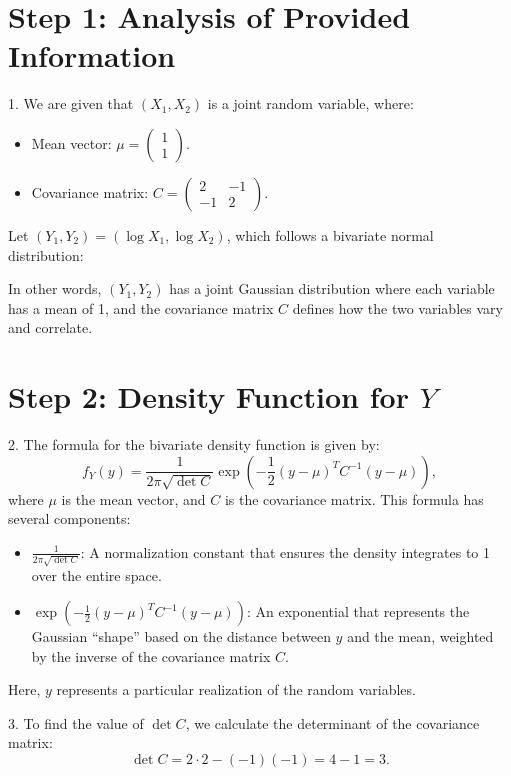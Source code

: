 \documentclass[10pt,letterpaper]{article}
\begin{document}
\section*{Step 1: Analysis of Provided Information}
1. We are given that \((X_1, X_2)\) is a joint random variable, where:
   \begin{itemize}
       \item Mean vector: \(\mu = \begin{pmatrix} 1 \\ 1 \end{pmatrix}\).
       \item Covariance matrix: \(C = \begin{pmatrix} 2 & -1 \\ -1 & 2 \end{pmatrix}\).
   \end{itemize}
   Let \((Y_1, Y_2) = (\log X_1, \log X_2)\), which follows a bivariate normal distribution:

   In other words, \((Y_1, Y_2)\) has a joint Gaussian distribution where each variable has a mean of 1, and the covariance matrix \(C\) defines how the two variables vary and correlate.

\section*{Step 2: Density Function for \(Y\)}
2. The formula for the bivariate density function is given by:
   \[
   f_Y(y) = \frac{1}{2\pi \sqrt{\det C}} \exp\left(-\frac{1}{2} (y - \mu)^T C^{-1} (y - \mu)\right),
   \]
   where \(\mu\) is the mean vector, and \(C\) is the covariance matrix. This formula has several components:
   \begin{itemize}
       \item \(\frac{1}{2\pi \sqrt{\det C}}\): A normalization constant that ensures the density integrates to 1 over the entire space.
       \item \(\exp\left(-\frac{1}{2} (y - \mu)^T C^{-1} (y - \mu)\right)\): An exponential that represents the Gaussian “shape” based on the distance between \(y\) and the mean, weighted by the inverse of the covariance matrix \(C\).
   \end{itemize}
   Here, \(y\) represents a particular realization of the random variables.

3. To find the value of \(\det C\), we calculate the determinant of the covariance matrix:
   \[
   \det C = 2 \cdot 2 - (-1)(-1) = 4 - 1 = 3.
   \]
\end{document}
